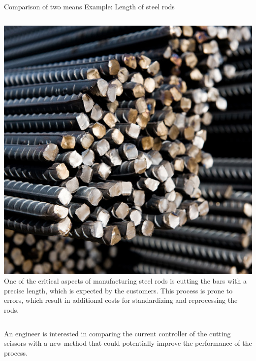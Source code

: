 \documentclass[t]{beamer}
\begin{document}
\begin{ftst}
{Comparison of two means}
{Example: Length of steel rods}
\begin{columns}
\includegraphics[width=\textwidth]{../figs/steelrods.jpg}
One of the critical aspects of manufacturing steel rods is cutting the bars with a precise length, which is expected by the customers.
\vhalf
This process is prone to errors, which result in additional costs for standardizing and reprocessing the rods.
\end{columns}
\vone
An engineer is interested in comparing the current controller of the cutting scissors with a new method that could potentially improve the performance of the process.
\end{ftst}

\end{document}
